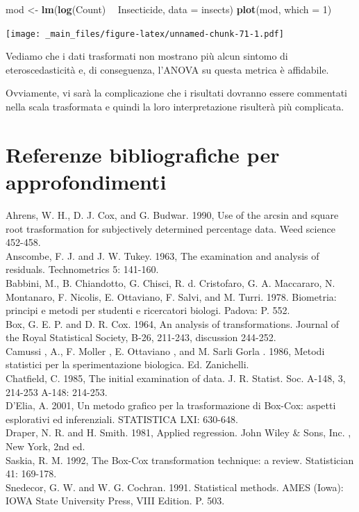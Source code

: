 \documentclass[a4paper,12pt,oneside]{book}
\newenvironment{Shaded}{\begin{snugshade}}{\end{snugshade}}
\newcommand{\KeywordTok}[1]{\textcolor[rgb]{0.13,0.29,0.53}{\textbf{#1}}}
\newcommand{\DataTypeTok}[1]{\textcolor[rgb]{0.13,0.29,0.53}{#1}}
\newcommand{\DecValTok}[1]{\textcolor[rgb]{0.00,0.00,0.81}{#1}}
\newcommand{\StringTok}[1]{\textcolor[rgb]{0.31,0.60,0.02}{#1}}
\newcommand{\OperatorTok}[1]{\textcolor[rgb]{0.81,0.36,0.00}{\textbf{#1}}}
\newcommand{\NormalTok}[1]{#1}
\theoremstyle{definition}
\theoremstyle{definition}
\theoremstyle{definition}
\theoremstyle{remark}
\begin{document}
\begin{Shaded}
\begin{Highlighting}[]
\NormalTok{mod <-}\StringTok{ }\KeywordTok{lm}\NormalTok{(}\KeywordTok{log}\NormalTok{(Count) }\OperatorTok{~}\StringTok{ }\NormalTok{Insecticide, }\DataTypeTok{data =}\NormalTok{ insects)}
\KeywordTok{plot}\NormalTok{(mod, }\DataTypeTok{which =} \DecValTok{1}\NormalTok{)}
\end{Highlighting}
\end{Shaded}

\texttt{[image: \_main\_files/figure-latex/unnamed-chunk-71-1.pdf]}

Vediamo che i dati trasformati non mostrano più alcun sintomo di
eteroscedasticità e, di conseguenza, l'ANOVA su questa metrica è
affidabile.

Ovviamente, vi sarà la complicazione che i risultati dovranno essere
commentati nella scala trasformata e quindi la loro interpretazione
risulterà più complicata.

\section{Referenze bibliografiche per
approfondimenti}\label{referenze-bibliografiche-per-approfondimenti}

Ahrens, W. H., D. J. Cox, and G. Budwar. 1990, Use of the arcsin and
square root trasformation for subjectively determined percentage data.
Weed science 452-458.\\
Anscombe, F. J. and J. W. Tukey. 1963, The examination and analysis of
residuals. Technometrics 5: 141-160.\\
Babbini, M., B. Chiandotto, G. Chisci, R. d. Cristofaro, G. A.
Maccararo, N. Montanaro, F. Nicolis, E. Ottaviano, F. Salvi, and M.
Turri. 1978. Biometria: principi e metodi per studenti e ricercatori
biologi. Padova: P. 552.\\
Box, G. E. P. and D. R. Cox. 1964, An analysis of transformations.
Journal of the Royal Statistical Society, B-26, 211-243, discussion
244-252.\\
Camussi , A., F. Moller , E. Ottaviano , and M. Sarli Gorla . 1986,
Metodi statistici per la sperimentazione biologica. Ed. Zanichelli.\\
Chatfield, C. 1985, The initial examination of data. J. R. Statist. Soc.
A-148, 3, 214-253 A-148: 214-253.\\
D'Elia, A. 2001, Un metodo grafico per la trasformazione di Box-Cox:
aspetti esplorativi ed inferenziali. STATISTICA LXI: 630-648.\\
Draper, N. R. and H. Smith. 1981, Applied regression. John Wiley \&
Sons, Inc. , New York, 2nd ed.\\
Saskia, R. M. 1992, The Box-Cox transformation technique: a review.
Statistician 41: 169-178.\\
Snedecor, G. W. and W. G. Cochran. 1991. Statistical methods. AMES
(Iowa): IOWA State University Press, VIII Edition. P. 503.\\
\end{document}
